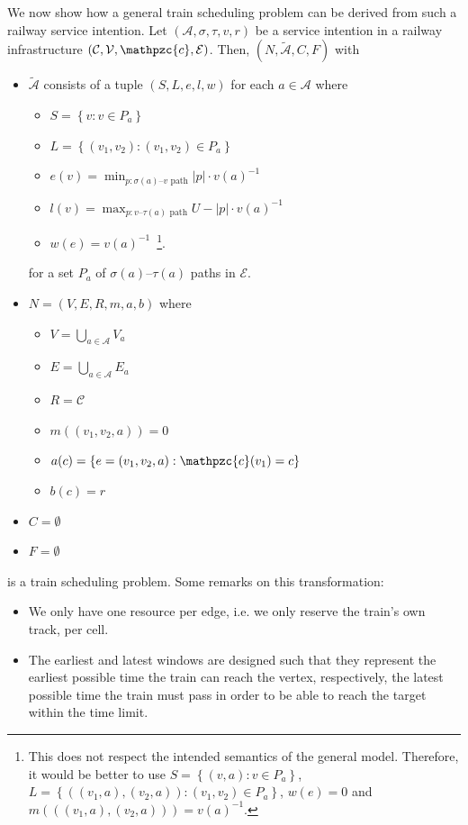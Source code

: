 \documentclass{article}
\begin{document}
We now show how a general train scheduling problem can be derived from such a railway service intention. Let $(\mathcal{A},\sigma,\tau,v,r)$ be a service intention in a railway infrastructure $(\mathcal{C}, \mathcal{V}, \mathpzc{c}, \mathcal{E})$.
Then, $(N,\tilde{\mathcal{A}},C,F)$ with
\begin{itemize}
    \item $\tilde{\mathcal{A}}$ consists of a tuple $(S,L,e,l,w)$ for each $a \in \mathcal{A}$ where 
        \begin{itemize}
            \item $S=\left\{ v: v \in P_a\right\}$
            \item $L=\left\{ (v_1,v_2): (v_1,v_2) \in P_a\right\}$
            \item $e(v)=\min_{p: \sigma(a)\textrm{--}v\textrm{ path}} \left|p\right| \cdot {v(a)}^{-1}$ 
            \item $l(v)=\max_{p: v\textrm{--}\tau(a)\textrm{ path}} U-\left|p\right| \cdot {v(a)}^{-1}$
            \item $w(e)={v(a)}^{-1}$\mbox{  }\footnote{This does not respect the intended semantics of the general model. Therefore, it would be better to use $S=\left\{ (v,a): v \in P_a\right\}$, $L=\left\{ ((v_1,a),(v_2,a)): (v_1,v_2) \in P_a\right\}$, $w(e)=0$ and $m(((v_1,a),(v_2,a)))={v(a)}^{-1}$.}.
        \end{itemize}
        for a set $P_a$ of $\sigma(a)$--$\tau(a)$ paths in $\mathcal{E}$.
        \item $N=(V,E,R,m,a,b)$ where
        \begin{itemize}
            \item $V=\bigcup_{a \in \mathcal{A}} V_a$
            \item $E=\bigcup_{a \in \mathcal{A}} E_a$
            \item $R=\mathcal{C}$
            \item $m((v_1,v_2,a))=0$
            \item $a(c) = \left\{ e=(v_1,v_2,a): \mathpzc{c}(v_1)=c \right\}$
            \item $b(c)=r$
        \end{itemize}
    \item $C=\emptyset$
    \item $F=\emptyset$
\end{itemize}
is a train scheduling problem. Some remarks on this transformation:
\begin{itemize}
    \item We only have one resource per edge, i.e. we only reserve the train's own track, per cell.
    \item The earliest and latest windows are designed such that they represent the earliest possible time the train can reach the vertex, respectively, the latest possible time the train must pass in order to be able to reach the target within the time limit. 
\end{itemize}
\end{document}
